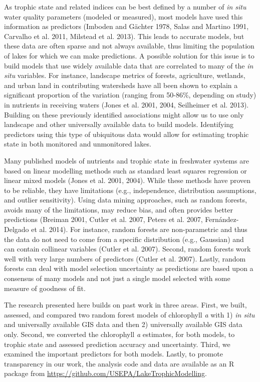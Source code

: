 \documentclass[12pt,]{article}
\begin{document}
As trophic state and related indices can be best defined by a number of
\emph{in situ} water quality parameters (modeled or measured), most
models have used this information as predictors (Imboden and G{ä}chter
1978, Salas and Martino 1991, Carvalho et al. 2011, Milstead et al.
2013). This leads to accurate models, but these data are often sparse
and not always available, thus limiting the population of lakes for
which we can make predictions. A possible solution for this issue is to
build models that use widely available data that are correlated to many
of the \emph{in situ} variables. For instance, landscape metrics of
forests, agriculture, wetlands, and urban land in contributing
watersheds have all been shown to explain a significant proportion of
the variation (ranging from 50-86\%, depending on study) in nutrients in
receiving waters (Jones et al. 2001, 2004, Seilheimer et al. 2013).
Building on these previously identified associations might allow us to
use only landscape and other universally available data to build models.
Identifying predictors using this type of ubiquitous data would allow
for estimating trophic state in both monitored and unmonitored lakes.

Many published models of nutrients and trophic state in freshwater
systems are based on linear modelling methods such as standard least
squares regression or linear mixed models (Jones et al. 2001, 2004).
While these methods have proven to be reliable, they have limitations
(e.g., independence, distribution assumptions, and outlier sensitivity).
Using data mining approaches, such as random forests, avoids many of the
limitations, may reduce bias, and often provides better predictions
(Breiman 2001, Cutler et al. 2007, Peters et al. 2007, Fernández-Delgado
et al. 2014). For instance, random forests are non-parametric and thus
the data do not need to come from a specific distribution (e.g.,
Gaussian) and can contain collinear variables (Cutler et al. 2007).
Second, random forests work well with very large numbers of predictors
(Cutler et al. 2007). Lastly, random forests can deal with model
selection uncertainty as predictions are based upon a consensus of many
models and not just a single model selected with some measure of
goodness of fit.

The research presented here builds on past work in three areas. First,
we built, assessed, and compared two random forest models of chlorophyll
\emph{a} with 1) \emph{in situ} and universally available GIS data and
then 2) universally available GIS data only. Second, we converted the
chlorophyll \emph{a} estimates, for both models, to trophic state and
assessed prediction accuracy and uncertainty. Third, we examined the
important predictors for both models. Lastly, to promote transparency in
our work, the analysis code and data are available as an R package from
\url{https://github.com/USEPA/LakeTrophicModelling}.
\end{document}
